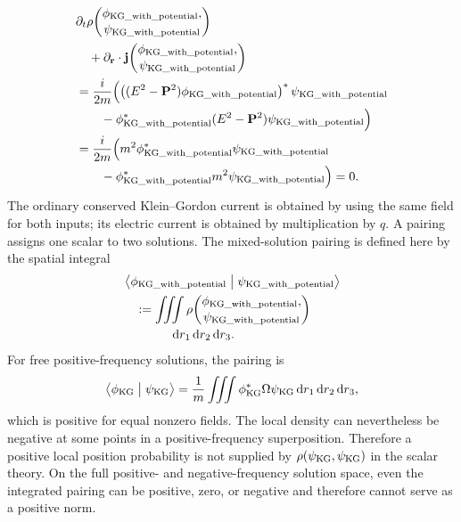 \documentclass[10pt,letterpaper]{article}
\let\STAamsmathtext\text
\newcommand{\eqtext}[1]{\STAamsmathtext{\normalfont\rmfamily #1}}
\renewcommand{\text}[1]{\STAamsmathtext{\normalfont\rmfamily #1}}
\newcommand{\vct}[1]{\mathbf{#1}}
\newcommand{\delop}{\partial}
\newcommand{\delr}{\delop_{\vct{r}}}
\newcommand{\gradv}{\delr}
\newcommand{\dd}{\mathrm d}
\begin{document}
\begin{align}
&\partial_t\rho\!\left(
\begin{gathered}
\phi_{\eqtext{KG\_with\_potential}},\\[-0.2em]
\psi_{\eqtext{KG\_with\_potential}}
\end{gathered}
\right)\notag\\
&\quad+\gradv\cdot\vct{j}\!\left(
\begin{gathered}
\phi_{\eqtext{KG\_with\_potential}},\\[-0.2em]
\psi_{\eqtext{KG\_with\_potential}}
\end{gathered}
\right)\notag\\
&=\frac{i}{2m}\Bigl(
\left((E^2-\vct{P}^2)
\phi_{\eqtext{KG\_with\_potential}}\right)^*
\psi_{\eqtext{KG\_with\_potential}}\notag\\
&\qquad
-\phi_{\eqtext{KG\_with\_potential}}^*
(E^2-\vct{P}^2)
\psi_{\eqtext{KG\_with\_potential}}
\Bigr)\notag\\
&=\frac{i}{2m}\Bigl(
m^2\phi_{\eqtext{KG\_with\_potential}}^*
\psi_{\eqtext{KG\_with\_potential}}\notag\\
&\qquad
-\phi_{\eqtext{KG\_with\_potential}}^*
m^2\psi_{\eqtext{KG\_with\_potential}}
\Bigr)=0.
\label{eq:kg-continuity-proof}
\end{align}
The ordinary conserved Klein--Gordon current is obtained by using the same
field for both inputs; its electric current is obtained by multiplication by
\(q\). A pairing assigns one scalar to two solutions. The mixed-solution
pairing is defined here by the spatial integral
\begin{equation}
\begin{aligned}
&\left\langle
\phi_{\eqtext{KG\_with\_potential}}
\mathrel{\big|}
\psi_{\eqtext{KG\_with\_potential}}
\right\rangle\\
&\quad:=\iiint\rho\!\left(
\begin{gathered}
\phi_{\eqtext{KG\_with\_potential}},\\[-0.2em]
\psi_{\eqtext{KG\_with\_potential}}
\end{gathered}
\right)\\[-0.2em]
&\qquad\qquad\dd r_1\,\dd r_2\,\dd r_3.
\end{aligned}
\label{eq:kg-pairing}
\end{equation}
For free positive-frequency solutions, the pairing is
\[
\left\langle\phi_{\eqtext{KG}}\mathrel{\big|}
\psi_{\eqtext{KG}}\right\rangle
=\frac1m\iiint
\phi_{\eqtext{KG}}^*\Omega\psi_{\eqtext{KG}}\,
\dd r_1\,\dd r_2\,\dd r_3,
\]
which is positive for equal nonzero fields. The local density can nevertheless
be negative at some points in a positive-frequency superposition. Therefore
a positive local position probability is not supplied by
\(\rho(\psi_{\eqtext{KG}},\psi_{\eqtext{KG}})\) in the scalar theory.
On the full positive- and
negative-frequency solution space, even the integrated pairing can be
positive, zero, or negative and therefore cannot serve as a positive norm.
\end{document}
